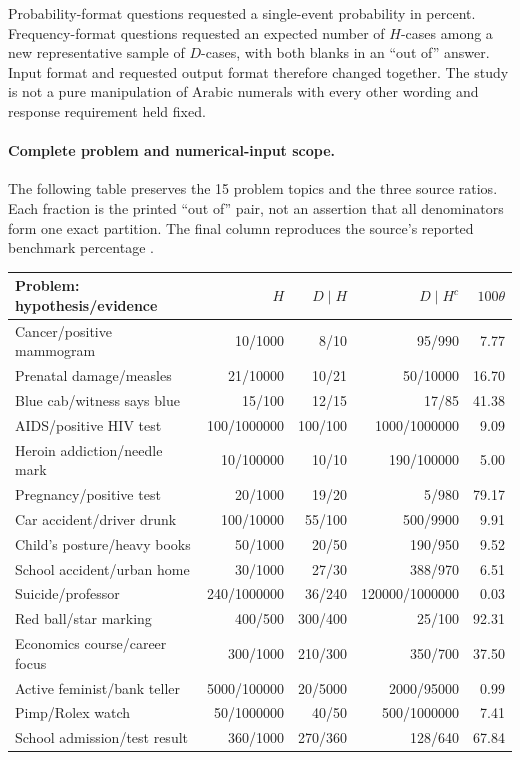 Probability-format questions requested a single-event probability in percent.
Frequency-format questions requested an expected number of \(H\)-cases
among a new representative sample of \(D\)-cases, with both blanks in
an ``out of'' answer. Input format and requested output format therefore
changed together. The study is not a pure manipulation of Arabic numerals
with every other wording and response requirement held fixed.

\paragraph{Complete problem and numerical-input scope.}
The following table preserves the 15 problem topics and the three source
ratios. Each fraction is the printed ``out of'' pair, not an assertion that
all denominators form one exact partition. The final column reproduces the
source's reported benchmark percentage
\cite[p.~693, table~2]{GigerenzerHoffrage1995FrequencyFormats}.
\begin{center}\small
\begin{tabular}{lrrrr}
Problem: hypothesis/evidence&\(H\)&\(D\mid H\)&\(D\mid H^c\)&\(100\theta\)\\\hline
Cancer/positive mammogram&10/1000&8/10&95/990&7.77\\
Prenatal damage/measles&21/10000&10/21&50/10000&16.70\\
Blue cab/witness says blue&15/100&12/15&17/85&41.38\\
AIDS/positive HIV test&100/1000000&100/100&1000/1000000&9.09\\
Heroin addiction/needle mark&10/100000&10/10&190/100000&5.00\\
Pregnancy/positive test&20/1000&19/20&5/980&79.17\\
Car accident/driver drunk&100/10000&55/100&500/9900&9.91\\
Child's posture/heavy books&50/1000&20/50&190/950&9.52\\
School accident/urban home&30/1000&27/30&388/970&6.51\\
Suicide/professor&240/1000000&36/240&120000/1000000&0.03\\
Red ball/star marking&400/500&300/400&25/100&92.31\\
Economics course/career focus&300/1000&210/300&350/700&37.50\\
Active feminist/bank teller&5000/100000&20/5000&2000/95000&0.99\\
Pimp/Rolex watch&50/1000000&40/50&500/1000000&7.41\\
School admission/test result&360/1000&270/360&128/640&67.84
\end{tabular}
\end{center}

